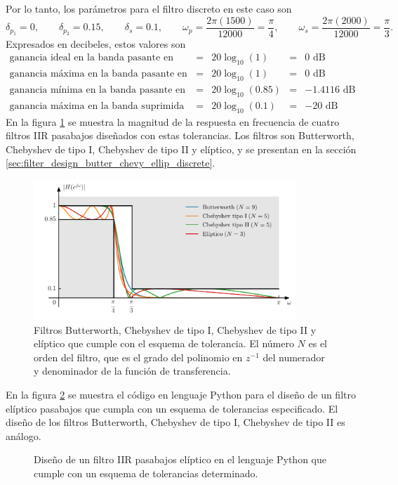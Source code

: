 \documentclass[a4paper]{report}
\begin{document}
Por lo tanto, los parámetros para el filtro discreto en este caso son
\[
 \delta_{p_1}=0,
 \qquad
 \delta_{p_2}=0.15,
 \qquad
 \delta_s=0.1,
 \qquad 
 \omega_p=\frac{2\pi(1500)}{12000}=\frac{\pi}{4},
 \qquad 
 \omega_s=\frac{2\pi(2000)}{12000}=\frac{\pi}{3}.
\]
Expresados en decibeles, estos  valores son
\[
 \begin{array}{lclcr}
  \textrm{ganancia ideal en la banda pasante en decibeles} & = & 20\log_{10}(1) & = & 0\textrm{ dB}\\
  \textrm{ganancia máxima en la banda pasante en decibeles} & = & 20\log_{10}(1) & = & 0\textrm{ dB}\\
  \textrm{ganancia mínima en la banda pasante en decibeles} & = & 20\log_{10}(0.85) & = & -1.4116\textrm{ dB}\\
  \textrm{ganancia máxima en la banda suprimida en decibeles} & = & 20\log_{10}(0.1) & = & -20\textrm{ dB}
 \end{array}
\]
En la figura \ref{fig:filter_design_specifications_example} se muestra la magnitud de la respuesta en frecuencia de cuatro filtros IIR pasabajos diseñados con estas tolerancias. Los filtros son Butterworth, Chebyshev de tipo I, Chebyshev de tipo II y elíptico, y se presentan en la sección \ref{sec:filter_design_butter_chevy_ellip_discrete}.
\begin{figure}[!htb]
 \begin{center}
 \includegraphics[width=0.88\textwidth]{figuras/filter_design_specifications_example.pdf}
 \caption{\label{fig:filter_design_specifications_example} Filtros Butterworth, Chebyshev de tipo I, Chebyshev de tipo II y elíptico que cumple con el esquema de tolerancia. El número \(N\) es el orden del filtro, que es el grado del polinomio en \(z^{-1}\) del numerador y denominador de la función de transferencia.}
 \end{center}
\end{figure}
En la figura \ref{fig:filter_design_specifications_code} se muestra el código en lenguaje Python para el diseño de un filtro elíptico pasabajos que cumpla con un esquema de tolerancias especificado. El diseño de los filtros Butterworth, Chebyshev de tipo I, Chebyshev de tipo II es análogo. 
\begin{figure}
\begin{center}

\caption{\label{fig:filter_design_specifications_code} Diseño de un filtro IIR pasabajos elíptico  en el lenguaje Python que cumple con un esquema de tolerancias determinado.}
\end{center}
\end{figure}
\end{document}
